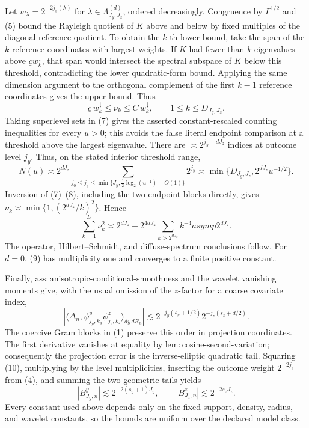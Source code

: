 Let \(w_\lambda=2^{-2j_y(\lambda)}\) for \(\lambda\in\Lambda_{J_y,J_z}^{(d)}\), ordered decreasingly. Congruence by \(\Gamma^{1/2}\) and (5) bound the Rayleigh quotient of \(K\) above and below by fixed multiples of the diagonal reference quotient. To obtain the \(k\)-th lower bound, take the span of the \(k\) reference coordinates with largest weights. If \(K\) had fewer than \(k\) eigenvalues above \(\underline c w_k^\downarrow\), that span would intersect the spectral subspace of \(K\) below this threshold, contradicting the lower quadratic-form bound. Applying the same dimension argument to the orthogonal complement of the first \(k-1\) reference coordinates gives the upper bound. Thus
\[
\underline c\,w_k^\downarrow\le\nu_k\le\overline C\,w_k^\downarrow,
\qquad 1\le k\le D_{J_y,J_z}.                                      \tag{7}
\]
Taking superlevel sets in (7) gives the asserted constant-rescaled counting inequalities for every \(u>0\); this avoids the false literal endpoint comparison at a threshold above the largest eigenvalue. There are \(\asymp2^{j_y+dJ_z}\) indices at outcome level \(j_y\). Thus, on the stated interior threshold range,
\[
N(u)\asymp2^{dJ_z}\sum_{j_0\le j_y\le\min\{J_y,\frac12\log_2(u^{-1})+O(1)\}}2^{j_y}
\asymp\min\{D_{J_y,J_z},2^{dJ_z}u^{-1/2}\}.                       \tag{8}
\]
Inversion of (7)--(8), including the two endpoint blocks directly, gives \(\nu_k\asymp\min\{1,(2^{dJ_z}/k)^2\}\). Hence
\[
\sum_{k=1}^{D}\nu_k^2
\asymp2^{dJ_z}+2^{4dJ_z}\sum_{k>2^{dJ_z}}k^{-4}asymp2^{dJ_z}.      \tag{9}
\]
The operator, Hilbert--Schmidt, and diffuse-spectrum conclusions follow. For \(d=0\), (9) has multiplicity one and converges to a finite positive constant.

Finally, \(\mathrm{ass{:}anisotropic\text{-}conditional\text{-}smoothness}\) and the wavelet vanishing moments give, with the usual omission of the \(z\)-factor for a coarse covariate index,
\[
|\langle\Delta_n,\psi^y_{j_y,k_y}\psi^z_{j_z,k_z}\rangle_{dy\,dR_n}|
\lesssim2^{-j_y(s_y+1/2)}2^{-j_z(s_z+d/2)}.                          \tag{10}
\]
The coercive Gram blocks in (1) preserve this order in projection coordinates. The first derivative vanishes at equality by \(\mathrm{lem{:}cosine\text{-}second\text{-}variation}\); consequently the projection error is the inverse-elliptic quadratic tail. Squaring (10), multiplying by the level multiplicities, inserting the outcome weight \(2^{-2j_y}\) from (4), and summing the two geometric tails yields
\[
|B^y_{J_y,n}|\lesssim2^{-2(s_y+1)J_y},
\qquad |B^z_{J_z,n}|\lesssim2^{-2s_zJ_z}.
\]
Every constant used above depends only on the fixed support, density, radius, and wavelet constants, so the bounds are uniform over the declared model class.